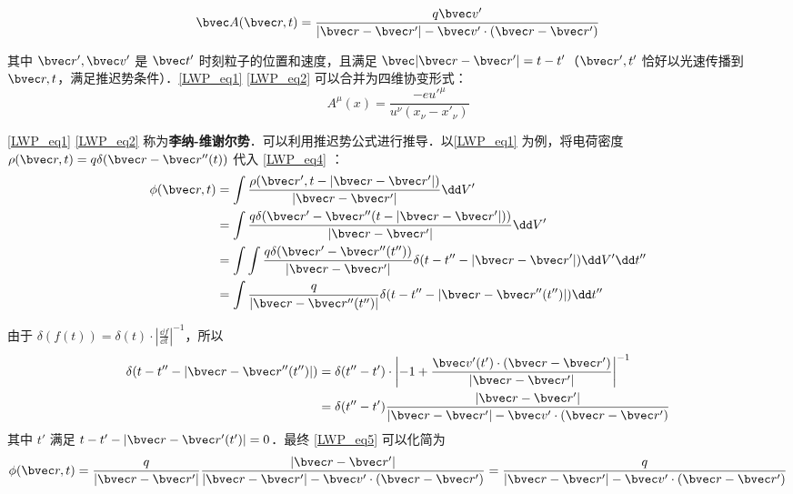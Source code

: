 \begin{equation}\label{LWP_eq2}
\bvec A(\bvec r,t)=\frac{q\bvec v'}{|\bvec r-\bvec r'|-\bvec v'\cdot (\bvec r-\bvec r')}
\end{equation}

其中 $\bvec r',\bvec v'$ 是 $\bvec t'$ 时刻粒子的位置和速度，且满足 $\bvec |\bvec r-\bvec r'|=t-t'$（$\bvec r',t'$ 恰好以光速传播到 $\bvec r,t$，满足推迟势条件）．\autoref{LWP_eq1} \autoref{LWP_eq2} 可以合并为四维协变形式：
\begin{equation}
A^\mu(x)=\frac{-e u'^\mu}{u^\nu (x_\nu-x'_\nu)}
\end{equation}

\autoref{LWP_eq1} \autoref{LWP_eq2} 称为\textbf{李纳-维谢尔势}．可以利用推迟势公式进行推导．以\autoref{LWP_eq1} 为例，将电荷密度 $\rho(\bvec r,t)=q\delta(\bvec r-\bvec r''(t))$ 代入 
\autoref{LWP_eq4} ：
\begin{equation}\label{LWP_eq5}
\begin{aligned}
\phi(\bvec r,t)&=\int \frac{\rho(\bvec r',t-|\bvec r-\bvec r'|)}{|\bvec r-\bvec r'|}\dd V'\\
&=\int \frac{q\delta(\bvec r'-\bvec r''(t-|\bvec r-\bvec r'|))}{|\bvec r-\bvec r'|}\dd V'\\
&=\int \int \frac{q\delta(\bvec r'-\bvec r''(t''))}{|\bvec r-\bvec r'|}\delta (t-t''-|\bvec r-\bvec r'|)\dd V'\dd t''\\
&=\int \frac{q}{|\bvec r-\bvec r''(t'')|}\delta (t-t''-|\bvec r-\bvec r''(t'')|)\dd t''
\end{aligned}\\
\end{equation}

由于 $\delta(f(t))=\delta(t)\cdot \left|\frac{\dd f}{\dd t}\right|^{-1}$，所以
\begin{equation}
\begin{aligned}
\delta (t-t''-|\bvec r-\bvec r''(t'')|)&=\delta(t''-t')\cdot \left|-1+\frac{\bvec v'(t')\cdot (\bvec r-\bvec r')}{|\bvec r-\bvec r'|}\right|^{-1}\\
&=\delta(t''-t')\frac{|\bvec r-\bvec r'|}{|\bvec r-\bvec r'|-\bvec v'\cdot (\bvec r-\bvec r')}
\end{aligned}
\end{equation}
其中 $t'$ 满足 $t-t'-|\bvec r-\bvec r'(t')|=0$．最终 \autoref{LWP_eq5} 可以化简为
\begin{equation}
\phi(\bvec r,t)=\frac{q}{|\bvec r-\bvec r'|}\frac{|\bvec r-\bvec r'|}{|\bvec r-\bvec r'|-\bvec v'\cdot (\bvec r-\bvec r')}=\frac{q}{|\bvec r-\bvec r'|-\bvec v'\cdot (\bvec r-\bvec r')}
\end{equation}

